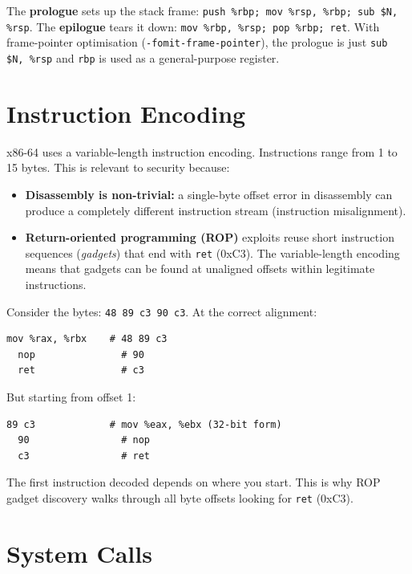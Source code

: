 \begin{definition}
	The \textbf{prologue} sets up the stack frame: \texttt{push \%rbp; mov \%rsp, \%rbp; sub \$N, \%rsp}. The \textbf{epilogue} tears it down: \texttt{mov \%rbp, \%rsp; pop \%rbp; ret}. With frame-pointer optimisation (\texttt{-fomit-frame-pointer}), the prologue is just \texttt{sub \$N, \%rsp} and \texttt{rbp} is used as a general-purpose register.
\end{definition}

\section{Instruction Encoding}

x86-64 uses a variable-length instruction encoding. Instructions range from 1 to 15 bytes. This is relevant to security because:

\begin{itemize}
	\item \textbf{Disassembly is non-trivial:} a single-byte offset error in disassembly can produce a completely different instruction stream (instruction misalignment).
	\item \textbf{Return-oriented programming (ROP)} exploits reuse short instruction sequences (\emph{gadgets}) that end with \texttt{ret} (0xC3). The variable-length encoding means that gadgets can be found at unaligned offsets within legitimate instructions.
\end{itemize}

\begin{example}
	Consider the bytes: \texttt{48 89 c3 90 c3}. At the correct alignment:
	\begin{lstlisting}[language=ASM]
  mov %rax, %rbx    # 48 89 c3
  nop               # 90
  ret               # c3
	\end{lstlisting}
	But starting from offset 1:
	\begin{lstlisting}[language=ASM]
  89 c3             # mov %eax, %ebx (32-bit form)
  90                # nop
  c3                # ret
	\end{lstlisting}
	The first instruction decoded depends on where you start. This is why ROP gadget discovery walks through all byte offsets looking for \texttt{ret} (0xC3).
\end{example}

\section{System Calls}

